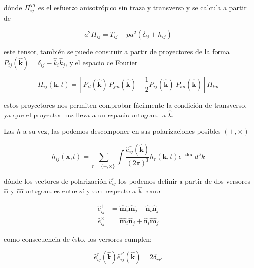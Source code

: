 \noindent
dónde $\Pi_{ij}^{TT}$ es el esfuerzo anisotrópico sin traza y transverso y se calcula a partir de

\begin{equation}
    a^2 \Pi_{ij} = T_{ij} - p a^2 \left( \delta_{ij} + h_{ij} \right)
\end{equation}

\noindent
este tensor, también se puede construir a partir de proyectores de la forma $P_{ij} \left( \hat{\textbf{k}} \right) = \delta_{ij} - \hat{k}_i \hat{k}_j$, y el espacio de Fourier

\begin{equation}
    \Pi_{ij} \left( \textbf{k}, t \right) = \left[ P_{il} \left( \hat{\textbf{k}} \right) \ P_{jm} \left( \hat{\textbf{k}} \right) - \frac{1}{2} P_{ij} \left( \hat{\textbf{k}} \right) \ P_{lm} \left( \hat{\textbf{k}} \right) \right] \Pi_{lm}
\end{equation}

\noindent
estos proyectores nos permiten comprobar fácilmente la condición de transverso, ya que el proyector nos lleva a un espacio ortogonal a $\hat{k}$.

Las $h$ a su vez, las podemos descomponer en sus polarizaciones posibles $(+, \times)$

\begin{equation}
    h_{ij} \left( \textbf{x}, t \right) = \sum_{r = \{ +, \times \}} \int \frac{\hat{e}^r_{ij} \left( \hat{\textbf{k}} \right)}{(2\pi)^3} h_r \left( \textbf{k}, t \right) e^{- i \textbf{k} \textbf{x}} \ d^3 k
\end{equation}

\noindent
dónde los vectores de polarización $\hat{e}^r_{ij}$ los podemos definir a partir de dos versores $\hat{\textbf{n}}$ y $\hat{\textbf{m}}$ ortogonales entre sí y con respecto a $\hat{\textbf{k}}$ como

\begin{equation}
    \begin{split}
        \hat{e}^+_{ij} &= \hat{\textbf{m}}_i \hat{\textbf{m}}_j - \hat{\textbf{n}}_i \hat{\textbf{n}}_j\\
        \hat{e}^\times_{ij} &= \hat{\textbf{m}}_i \hat{\textbf{n}}_j + \hat{\textbf{n}}_i \hat{\textbf{m}}_j
    \end{split}
\end{equation}

\noindent
como consecuencia de ésto, los versores cumplen:

\begin{equation}
    \hat{e}_{ij}^r \left( \hat{\textbf{k}} \right) \hat{e}^{r'}_{ij} \left( \hat{\textbf{k}} \right) = 2 \delta_{rr'}
\end{equation}

